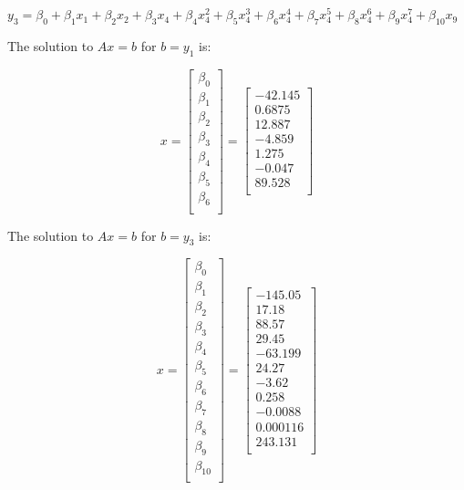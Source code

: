\documentclass[
]{article}
\begin{document}
\(y_{3} = \beta_{0} + \beta_{1}x_{1} + \beta_{2}x_{2} + \beta_{3}x_{4} + \beta_{4}x_{4}^{2} + \beta_{5}x_{4}^{3} + \beta_{6}x_{4}^{4} + \beta_{7}x_{4}^{5} + \beta_{8}x_{4}^{6} + \beta_{9}x_{4}^{7} + \beta_{10}x_{9}\)

The solution to \(Ax = b\) for \(b = y_{1}\) is:

\[
x =
  \begin{bmatrix}
    \beta_{0} \\
     \beta_{1} \\
    \beta_{2} \\
     \beta_{3}\\
     \beta_{4} \\
    \beta_{5} \\
    \beta_{6} \\
  \end{bmatrix} =
  \begin{bmatrix}
    -42.145 \\
    0.6875 \\
    12.887 \\
    -4.859 \\
    1.275 \\
    -0.047 \\
    89.528 \\
  \end{bmatrix}
\]

The solution to \(Ax = b\) for \(b = y_{3}\) is:

\[
x =
  \begin{bmatrix}
    \beta_{0} \\
     \beta_{1} \\
    \beta_{2} \\
     \beta_{3}\\
     \beta_{4} \\
    \beta_{5} \\
    \beta_{6} \\
    \beta_{7}\\
     \beta_{8} \\
    \beta_{9} \\
    \beta_{10} \\
  \end{bmatrix} =
  \begin{bmatrix}
    -145.05 \\
    17.18 \\
    88.57 \\
    29.45 \\
    -63.199 \\
    24.27 \\
    -3.62 \\
    0.258 \\
    -0.0088 \\
    0.000116 \\
    243.131 \\
  \end{bmatrix} 
\]
\end{document}
